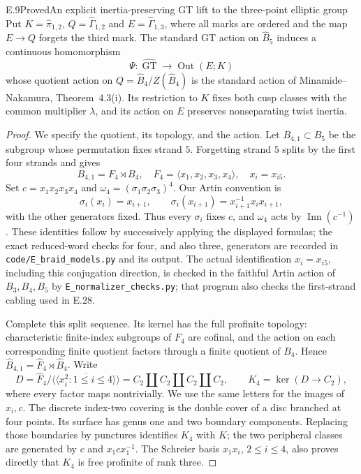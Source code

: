 \begin{result}{E.9}{Proved}{An explicit inertia-preserving GT lift to
the three-point elliptic group}
Put $K=\widehat\pi_{1,2}$, $Q=\widehat\Gamma_{1,2}$ and
$E=\widehat\Gamma_{1,3}$, where all marks are ordered and the
map $E\to Q$ forgets the third mark.  The standard GT action on
$\widehat B_5$ induces a continuous homomorphism
\[
 \Psi:\widehat{\operatorname{GT}}\longrightarrow
           \operatorname{Out}(E;K)
                                                               \tag{E.10}
\]
whose quotient action on $Q=\widehat B_4/Z(\widehat B_4)$ is the
standard action of Minamide--Nakamura, Theorem~4.3(i).  Its restriction
to $K$ fixes both cusp classes with the common multiplier $\lambda$,
and its action on $E$ preserves nonseparating twist inertia.
\end{result}
\begin{proof}
We specify the quotient, its topology, and the action.  Let
$B_{4,1}\subset B_5$ be the subgroup whose permutation fixes strand
$5$.  Forgetting strand $5$ splits by the first four strands and gives
\[
 B_{4,1}=F_4\rtimes B_4,
 \quad F_4=\langle x_1,x_2,x_3,x_4\rangle,
 \quad x_i=x_{i5}.
\]
Set $c=x_1x_2x_3x_4$ and $\omega_4=(\sigma_1\sigma_2\sigma_3)^4$.
Our Artin convention is
\[
 \sigma_i(x_i)=x_{i+1},\qquad
 \sigma_i(x_{i+1})=x_{i+1}^{-1}x_ix_{i+1},
\]
with the other generators fixed.  Thus every $\sigma_i$ fixes $c$,
and $\omega_4$ acts by $\operatorname{Inn}(c^{-1})$.  These identities
follow by successively applying the displayed formulas; the exact
reduced-word checks for four, and also three, generators are recorded
in \texttt{code/E\_braid\_models.py} and its output.
The actual identification $x_i=x_{i5}$, including
this conjugation direction, is checked in the
faithful Artin action of $B_3,B_4,B_5$ by
\texttt{E\_normalizer\_checks.py}; that program also
checks the first-strand cabling used in E.28.

Complete this split sequence.  Its kernel has the full profinite
topology: characteristic finite-index subgroups of $F_4$ are cofinal,
and the action on each corresponding finite quotient factors through
a finite quotient of $B_4$.  Hence
$\widehat B_{4,1}=\widehat F_4\rtimes\widehat B_4$.
Write
\[
 D=\widehat F_4/\overline{\langle\!\langle x_i^2:1\leq i\leq4
                              \rangle\!\rangle}
       =C_2\amalg C_2\amalg C_2\amalg C_2,
 \qquad K_4=\ker(D\to C_2),                               \tag{E.11}
\]
where every factor maps nontrivially.  We use the same letters for
the images of $x_i,c$.  The discrete index-two covering is the double
cover of a disc branched at four points.  Its surface has genus one
and two boundary components.  Replacing those boundaries by punctures
identifies $K_4$ with $K$; the two peripheral classes are generated by
$c$ and $x_1cx_1^{-1}$.  The Schreier basis $x_1x_i$, $2\leq i\leq4$,
also proves directly that $K_4$ is free profinite of rank three.


\end{proof}
